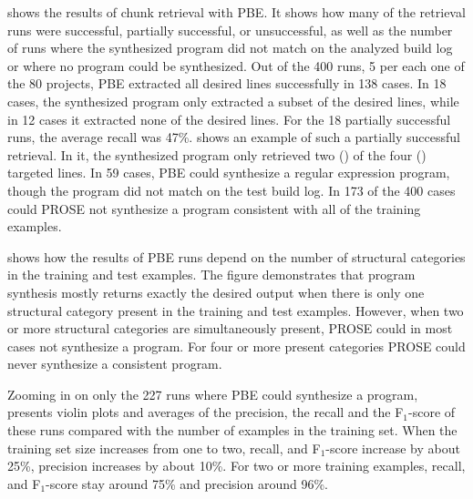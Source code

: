  shows the results of chunk
retrieval with PBE.
It shows how many of the retrieval runs were successful,
partially successful, or unsuccessful,
as well as the number of runs where the
synthesized program did not match on the analyzed build log or where
no program could be synthesized.
Out of the 400 runs, 5 per each one of the 80 projects,
PBE extracted all desired lines successfully in 138 cases.
In 18 cases, the synthesized program only extracted a
subset of the desired lines, while in 12 cases it extracted none of
the desired lines.
For the 18 partially successful runs, the average recall
was 47\%.
 shows an example of such
a partially successful retrieval.
In it, the synthesized program only
retrieved two ()
of the four () targeted lines.
In 59 cases, PBE could synthesize a regular expression program, though
the program did not match on the test build log.
In 173 of the 400 cases
could PROSE not synthesize a program consistent with all of the training
examples.

 shows how
the results of PBE
runs depend on the number of structural categories in the training and
test examples.
The figure demonstrates that program synthesis mostly
returns exactly the desired output when there is only one
structural category present in the training and test examples.
However, when
two or more structural categories are simultaneously present,
PROSE could in most cases not synthesize a program.
For four or more present
categories PROSE could never synthesize a consistent program.

Zooming in on only the 227 runs where PBE could synthesize a program,
presents violin plots and averages of the precision, the recall
and the F$_{1}$-score
of these runs compared with the number of examples in the training set.
When the training set
size increases from one to two, recall, and F$_{1}$-score increase by
about 25\%, precision increases by about 10\%.
For two or more
training examples, recall, and F$_{1}$-score stay around 75\% and
precision around 96\%.

